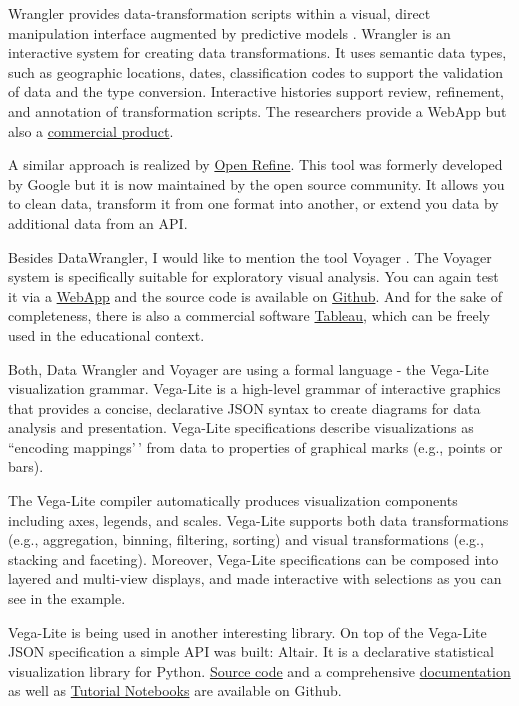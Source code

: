 \documentclass[
]{book}
\begin{document}
Wrangler provides data-transformation scripts within a visual, direct manipulation interface augmented by predictive models \citep{kandel2011wrangler}. Wrangler is an interactive system for creating data transformations. It uses semantic data types, such as geographic locations, dates, classification codes to support the validation of data and the type conversion. Interactive histories support review, refinement, and annotation of transformation scripts. The researchers provide a WebApp but also a \href{https://www.trifacta.com/start-wrangling/}{commercial product}.

A similar approach is realized by \href{https://openrefine.org/}{Open Refine}. This tool was formerly developed by Google but it is now maintained by the open source community. It allows you to clean data, transform it from one format into another, or extend you data by additional data from an API.

Besides DataWrangler, I would like to mention the tool Voyager \citep{wongsuphasawat2015voyager}. The Voyager system is specifically suitable for exploratory visual analysis. You can again test it via a \href{https://vega.github.io/voyager/}{WebApp} and the source code is available on \href{https://github.com/vega/voyager}{Github}. And for the sake of completeness, there is also a commercial software \href{https://www.tableau.com/}{Tableau}, which can be freely used in the educational context.

Both, Data Wrangler and Voyager are using a formal language - the Vega-Lite visualization grammar. Vega-Lite is a high-level grammar of interactive graphics that provides a concise, declarative JSON syntax to create diagrams for data analysis and presentation. Vega-Lite specifications describe visualizations as ``encoding mappings'\,' from data to properties of graphical marks (e.g., points or bars).

The Vega-Lite compiler automatically produces visualization components including axes, legends, and scales. Vega-Lite supports both data transformations (e.g., aggregation, binning, filtering, sorting) and visual transformations (e.g., stacking and faceting). Moreover, Vega-Lite specifications can be composed into layered and multi-view displays, and made interactive with selections as you can see in the example.

Vega-Lite is being used in another interesting library. On top of the Vega-Lite JSON specification a simple API was built: Altair. It is a declarative statistical visualization library for Python. \href{https://github.com/altair-viz/altair}{Source code} and a comprehensive \href{https://altair-viz.github.io/}{documentation} as well as \href{github.com/altair-viz/altair_notebooks}{Tutorial Notebooks} are available on Github.

  
\end{document}

